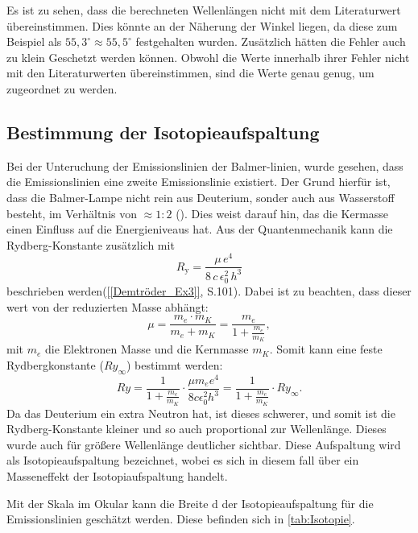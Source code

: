 Es ist zu sehen, dass die berechneten Wellenlängen nicht mit dem Literaturwert übereinstimmen. 
Dies könnte an der Näherung der Winkel liegen, da diese zum Beispiel als $55,3^\circ \approx 55,5^\circ$ festgehalten wurden.
Zusätzlich hätten die Fehler auch zu klein Geschetzt werden können.
Obwohl die Werte innerhalb ihrer Fehler nicht mit den Literaturwerten übereinstimmen, sind die Werte genau genug, um zugeordnet zu werden. 


\subsection{Bestimmung der Isotopieaufspaltung}

Bei der Unteruchung der Emissionslinien der Balmer-linien, wurde gesehen, dass die Emissionslinien eine zweite Emissionslinie existiert.
Der Grund hierfür ist, dass die Balmer-Lampe nicht rein aus Deuterium, sonder auch aus Wasserstoff besteht, im Verhältnis von $\approx 1 : 2$ (\cite{praktikum}). 
Dies weist darauf hin, das die Kermasse einen Einfluss auf die Energieniveaus hat. 
Aus der Quantenmechanik kann die Rydberg-Konstante zusätzlich mit 
\begin{equation}
  R_{\mathrm{y}} = \frac{\mu\,e^4}{8\,c\,\epsilon_0^2\,h^3}
\end{equation}
beschrieben werden(\cref{[Demtröder_Ex3]}, S.101). Dabei ist zu beachten, dass dieser wert von der reduzierten Masse abhängt:
\begin{equation}
    \mu = \frac{m_e \cdot m_K}{m_e + m_K} = \frac{m_e}{1+\frac{m_e}{m_K}},
\end{equation}
mit $m_e$ die Elektronen Masse und die Kernmasse $m_K$.
Somit kann eine feste Rydbergkonstante ($Ry_\infty$) bestimmt werden: 
\begin{equation}
    Ry = \frac{1}{1+\frac{m_e}{m_K}}\cdot \frac{\mu m_e e^4}{8c \epsilon_0^2h^3} = \frac{1}{1 + \frac{m_e}{m_K}}\cdot Ry_\infty.
\end{equation}
Da das Deuterium ein extra Neutron hat, ist dieses schwerer, und somit ist die Rydberg-Konstante kleiner und so auch proportional zur Wellenlänge. 
Dieses wurde auch für größere Wellenlänge deutlicher sichtbar.
Diese Aufspaltung wird als Isotopieaufspaltung bezeichnet, wobei es sich in diesem fall über ein Masseneffekt der Isotopiaufspaltung handelt.

Mit der Skala im Okular kann die Breite d der Isotopieaufspaltung für die Emissionslinien geschätzt werden. 
Diese befinden sich in \cref{tab:Isotopie}.

